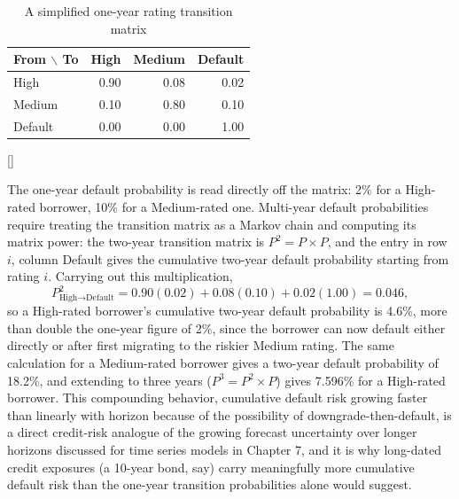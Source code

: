 \documentclass[../ai_in_finance]{subfiles}
\begin{document}
\begin{table}[htbp]
\centering
\begin{lrbox}{\bookmeasuredbox}
\begin{tabular}{lrrr}
\toprule
From $\backslash$ To & High & Medium & Default \\
\midrule
High    & 0.90 & 0.08 & 0.02 \\
Medium  & 0.10 & 0.80 & 0.10 \\
Default & 0.00 & 0.00 & 1.00 \\
\bottomrule
\end{tabular}
\end{lrbox}
\ifdim\wd\bookmeasuredbox<0.65\linewidth
\setlength{\bookcapwidth}{0.65\linewidth}
\else
\setlength{\bookcapwidth}{\wd\bookmeasuredbox}
\fi
{}[\bookcapwidth]{
\usebox{\bookmeasuredbox}
}{
\caption{A simplified one-year rating transition matrix}
\label{tab:transition_matrix}
}
\end{table}

The one-year default probability is read directly off the matrix: 2\% for a High-rated borrower, 10\% for a Medium-rated one. Multi-year default probabilities require treating the transition matrix as a Markov chain and computing its matrix power: the two-year transition matrix is $P^2 = P \times P$, and the entry in row $i$, column Default gives the cumulative two-year default probability starting from rating $i$. Carrying out this multiplication,
\begin{equation*}
P^2_{\text{High}\to\text{Default}} = 0.90(0.02) + 0.08(0.10) + 0.02(1.00) = 0.046,
\end{equation*}
so a High-rated borrower's cumulative two-year default probability is 4.6\%, more than double the one-year figure of 2\%, since the borrower can now default either directly or after first migrating to the riskier Medium rating.
The same calculation for a Medium-rated borrower gives a two-year default probability of 18.2\%, and extending to three years ($P^3 = P^2 \times P$) gives 7.596\% for a High-rated borrower. This compounding behavior, cumulative default risk growing faster than linearly with horizon because of the possibility of downgrade-then-default, is a direct credit-risk analogue of the growing forecast uncertainty over longer horizons discussed for time series models in Chapter 7, and it is why long-dated credit exposures (a 10-year bond, say) carry meaningfully more cumulative default risk than the one-year transition probabilities alone would suggest.
\end{document}
